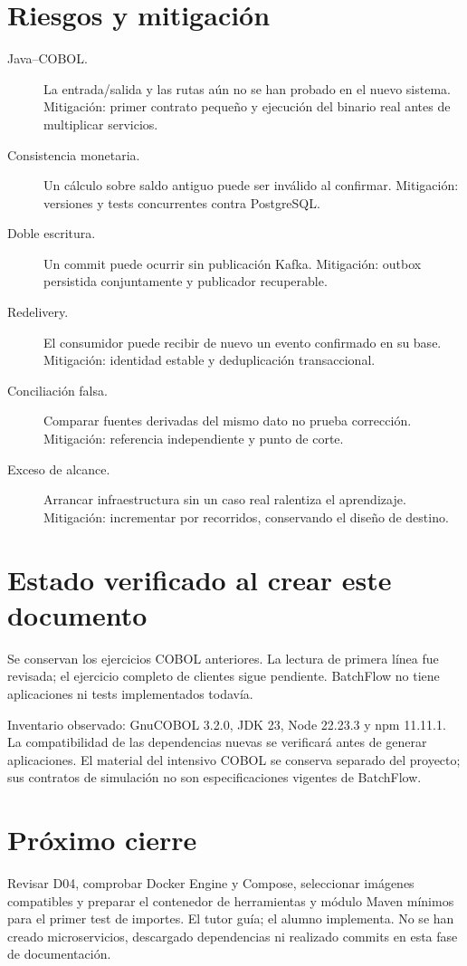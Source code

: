 \section{Riesgos y mitigación}
\begin{description}
\item[Java--COBOL.] La entrada/salida y las rutas aún no se han probado en el nuevo sistema. Mitigación: primer contrato pequeño y ejecución del binario real antes de multiplicar servicios.
\item[Consistencia monetaria.] Un cálculo sobre saldo antiguo puede ser inválido al confirmar. Mitigación: versiones y tests concurrentes contra PostgreSQL.
\item[Doble escritura.] Un commit puede ocurrir sin publicación Kafka. Mitigación: outbox persistida conjuntamente y publicador recuperable.
\item[Redelivery.] El consumidor puede recibir de nuevo un evento confirmado en su base. Mitigación: identidad estable y deduplicación transaccional.
\item[Conciliación falsa.] Comparar fuentes derivadas del mismo dato no prueba corrección. Mitigación: referencia independiente y punto de corte.
\item[Exceso de alcance.] Arrancar infraestructura sin un caso real ralentiza el aprendizaje. Mitigación: incrementar por recorridos, conservando el diseño de destino.
\end{description}

\section{Estado verificado al crear este documento}
Se conservan los ejercicios COBOL anteriores. La lectura de primera línea fue revisada; el ejercicio completo de clientes sigue pendiente. BatchFlow no tiene aplicaciones ni tests implementados todavía.

Inventario observado: GnuCOBOL 3.2.0, JDK 23, Node 22.23.3 y npm 11.11.1. La compatibilidad de las dependencias nuevas se verificará antes de generar aplicaciones. El material del intensivo COBOL se conserva separado del proyecto; sus contratos de simulación no son especificaciones vigentes de BatchFlow.

\section{Próximo cierre}
Revisar D04, comprobar Docker Engine y Compose, seleccionar imágenes compatibles y preparar el contenedor de herramientas y módulo Maven mínimos para el primer test de importes. El tutor guía; el alumno implementa. No se han creado microservicios, descargado dependencias ni realizado commits en esta fase de documentación.

